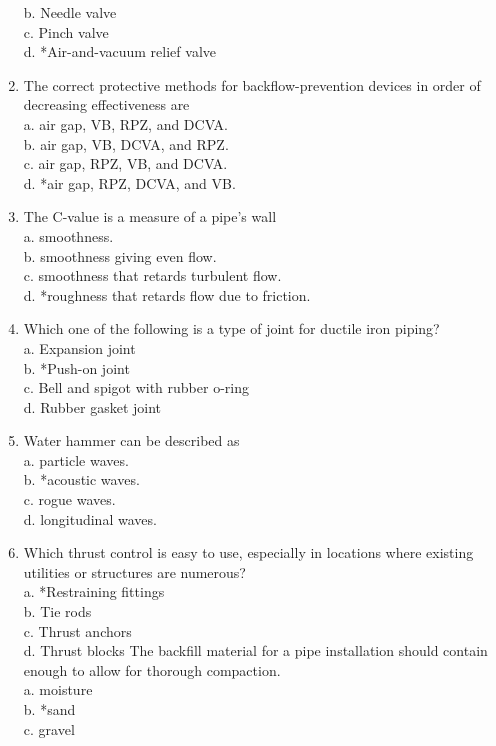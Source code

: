 \begin{enumerate}[1.]
b. Needle valve\\
c. Pinch valve\\
d. *Air-and-vacuum relief valve\\
\item The correct protective methods for backflow-prevention devices in order of decreasing effectiveness are\\
a. air gap, VB, RPZ, and DCVA.\\
b. air gap, VB, DCVA, and RPZ.\\
c. air gap, RPZ, VB, and DCVA.\\
d. *air gap, RPZ, DCVA, and VB.\\
\item The $\mathrm{C}$-value is a measure of a pipe's wall\\
a. smoothness.\\
b. smoothness giving even flow.\\
c. smoothness that retards turbulent flow.\\
d. *roughness that retards flow due to friction.\\
\item Which one of the following is a type of joint for ductile iron piping?\\
a. Expansion joint\\
b. *Push-on joint\\
c. Bell and spigot with rubber o-ring\\
d. Rubber gasket joint\\
\item Water hammer can be described as\\
a. particle waves.\\
b. *acoustic waves.\\
c. rogue waves.\\
d. longitudinal waves.\\
\item Which thrust control is easy to use, especially in locations where existing utilities or structures are numerous?\\
a. *Restraining fittings\\
b. Tie rods\\
c. Thrust anchors\\
d. Thrust blocks 
The backfill material for a pipe installation should contain enough to allow for thorough compaction.\\
a. moisture\\
b. *sand\\
c. gravel\\

\end{enumerate}
